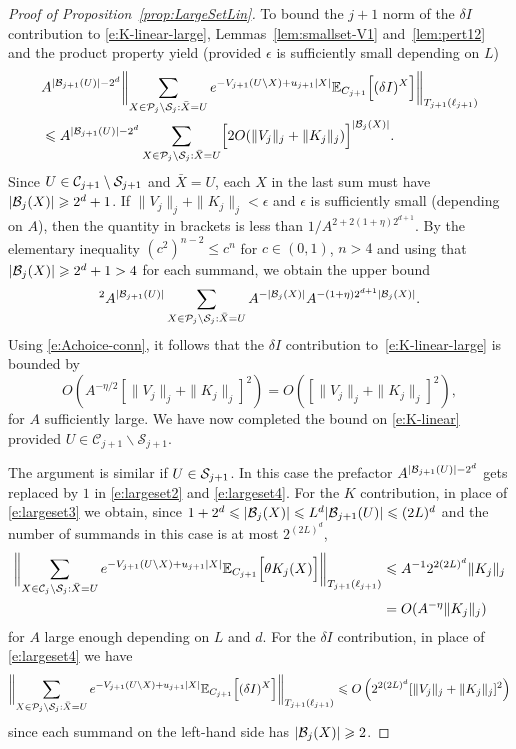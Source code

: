 \documentclass[11pt]{amsart}
\numberwithin{equation}{section}
\numberwithin{theorem}{section}
\newcommand{\1}{{\bf 1}}
\begin{document}
\begin{proof}[Proof of Proposition~\ref{prop:LargeSetLin}]
To bound the $j+1$ norm of the $\delta I$ contribution to \eqref{e:K-linear-large},
Lemmas~\ref{lem:smallset-V1} and~\ref{lem:pert12} and the product
property yield (provided $\epsilon$ is sufficiently small depending on $L$)
\begin{align}
 \label{e:largeset4}
& A^{|\mathcal B_{j+1}(U)|-2^d}  \biggl\lVert   \sum_{X\in {\ensuremath{\mathcal P}_j} \setminus \mathcal S_j: \bar X=U} e^{-V_{j+1}(U\setminus X)+u_{j+1}|X|}  \mathbb{E}_{C_{j+1}}\Bigl[{ (\delta I)^X}\Bigr]  \biggr\rVert_{T_{j+1}(\ell_{j+1})}\nonumber\\
&\leqslant  A^{|\mathcal B_{j+1}(U)|-2^d}
    \sum_{X\in {\ensuremath{\mathcal P}_j }\setminus \mathcal S_j: \bar X=U} \Bigl[{ 2O(\|V_j\|_j + \|K_j\|_j) }\Bigr]^{|\mathcal B_j(X)|}   .
\end{align}
Since $U \in \mathcal C_{j+1} \setminus \mathcal S_{j+1}$ and $\bar X=U$, each $X$
in the last sum must have $|\mathcal B_{j}(X)|\geqslant 2^{d}+1$.  If
$\|V_j\|_j + \|K_j\|_j<\epsilon$ and $\epsilon$ is sufficiently small
(depending on $A$), then the quantity in brackets is less than
$1/A^{2+2(1+\eta)2^{d+1}}$.  By the elementary inequality
$(c^{2})^{n-2}\leq c^{n}$ for $c\in (0,1)$, $n>4$ and using that
$|\mathcal B_{j}(X)|\geqslant 2^{d}+1>4$ for each summand, we obtain the upper
bound
\begin{equation}
  [O(\|V_j\|_j + \|K_j\|_j)]^{2} A^{|\cB_{j+1}(U)|} \sum_{X\in {\cP_j}
    \setminus \cS_j: \bar X=U} A^{-|\cB_{j}(X)|} A^{-(1+\eta)2^{d+1}|\cB_j(X)|}. 
\end{equation}
Using \eqref{e:Achoice-conn}, it follows that the
$\delta I$ contribution to~\eqref{e:K-linear-large} is bounded by
\begin{equation}
  O(A^{-\eta/2}[\|V_j\|_j + \|K_j\|_j]^{2})
  =  O([\|V_j\|_j + \|K_j\|_j]^{2})
  ,
\end{equation}
for $A$ sufficiently large.
We have now completed the bound on \eqref{e:K-linear} provided $U\in \mathcal C_{j+1}\backslash \mathcal S_{j+1}$.

The argument is similar if $U \in \mathcal S_{j+1}$.  In this case the
prefactor $A^{|\mathcal B_{j+1}(U)|-2^d}$ gets replaced by $1$ in
\eqref{e:largeset2} and \eqref{e:largeset4}.  For the $K$
contribution, in place of \eqref{e:largeset3} we obtain, since
$1+ 2^d\leqslant |\mathcal B_j(X)|\leqslant L^d |\mathcal B_{j+1}(U)|\leqslant (2L)^d$ and the
number of summands in this case is at most $2^{(2L)^d}$,
\begin{align}
  \biggl\lVert \sum_{X\in \mathcal C_j \setminus \mathcal S_j: \bar X=U}
   e^{-V_{j+1}(U\setminus X)+u_{j+1}|X|} \mathbb{E}_{C_{j+1}}\Bigl[{\theta K_j(X)}\Bigr]
   \biggr\rVert_{T_{j+1}(\ell_{j+1})}
  &\leqslant A^{-1}2^{2(2L)^d}\|K_j\|_j
    \nonumber\\
  &=O(A^{-\eta} \|K_j\|_j)
\end{align}
for $A$ large enough depending on $L$ and $d$.  For the $\delta I$
contribution, in place of \eqref{e:largeset4} we have
\begin{equation}
   \biggl\lVert  \sum_{X\in \mathcal P_j \setminus \mathcal S_j: \bar X=U}   e^{-V_{j+1}(U\setminus X)+u_{j+1}|X|} \mathbb{E}_{C_{j+1}}\Bigl[{(\delta I)^X}\Bigr]  \biggr\rVert_{T_{j+1}(\ell_{j+1})}
  \leqslant  O\left(2^{2 {(2L)^{d}}} 
    [\|V_j\|_j + \|K_j\|_j]^{2}\right)
\end{equation}
since each summand on the left-hand side has $|\mathcal B_j(X)|\geqslant  2$. 



\end{proof}
\end{document}
